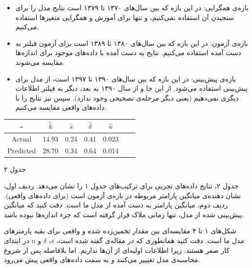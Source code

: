 \documentclass[11pt, fleqn]{article}
\begin{document}
\begin{multicols}{2}
\begin{itemize}
\item
بازه‌ی همگرایی: در این بازه که بین سال‌های ۱۳۷۰ تا ۱۳۷۹ است نتایج مدل را برای سنجیدن آن استفاده نمی‌کنیم، و تنها برای آموزش و همگرایی متغیر‌ها استفاده می‌کنیم.

\item
بازه‌ی آزمون: در این بازه که بین سال‌های ۱۳۸۰ تا ۱۳۸۹ است برای آزمون فیلتر به دست آمده استفاده می‌کنیم. نتایح به دست آمده با داده‌های موجود برای اندازه‌ها مقایسه می‌شوند. 
\item 
بازه‌ی پیش‌بینی: در این بازه که بین سال‌های ۱۳۹۰ تا ۱۳۹۷ است، از مدل برای پیش‌بینی استفاده می‌شود. از این جا و از سال ۱۳۹۰ به بعد، دیگر به فیلتر اطلاعات دیگری نمی‌دهیم (یعنی دیگر مرحله‌ی تصحیحی وجود ندارد).  سپس نیز نتایج را با داده‌های واقعی مقایسه می‌کنیم. 

\end{itemize}



\begin{latin}
\begin{tabular}{|c| c| c| c| c|c|c|} 
\hline 
- & $\hat{k}$ & $\hat{s}$ & $\hat{\delta}$ & $\hat{n}$ \\ [0.5ex]
\hline 
Actual 	  & 14.93 & 0.24 & 0.41 & 0.023 \\ 
Predicted & 28.70 & 0.34 & 0.64 & 0.014 \\
 [1ex] 
\hline 
\end{tabular}
\end{latin} 

\begin{center}
جدول ۲
\end{center}

 
جدول ۲، نتایج داده‌های تجربی برای ترکیب‌های جدول ۱ را نشان می‌دهد. ردیف اول، نشان دهنده‌ی میانگین پارامتر مربوطه در بازه‌ی آزمون است (برای داده‌های واقعی). ردیف دوم، میانگین پارامتر به دست آمده از مدل ما است. دقت کنید که میانگین پیش‌بینی شده از مدل، تنها زمانی ملاک قرار گرفته است که جزء اندازه‌ها نبوده باشد.


شکل‌های ۱ تا ۴ مقایسه‌ای بین مقدار تخمین‌زده شده و واقعی برای بقیه پارمتر‌های مدل ما است. دقت کنید  همانطوری که در مقاله‌ی
\cite{main}
  گفته شده است، $s$، 
  $\delta$
   و
   $n$
    در ابتدای کار صفر هستند. زیرا اطلاعات اولیه‌ای از آن‌ها نداریم. اما بلافاصله پس از شروع محاسبه‌ی مدل تغیییر می‌کنند و به سمت داده‌های واقعی پیش می‌رود.
    






\end{multicols}
\end{document}
